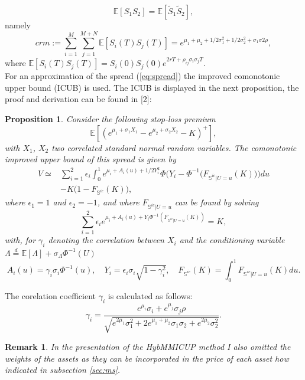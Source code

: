 \documentclass[a4paper]{article}
\newtheorem{prop}{Proposition}
\newtheorem*{remark}{Remark}
\begin{document}
$$\mathbb{E}[S_1S_2] = \mathbb{E}[\tilde{S}_1\tilde{S}_2],$$
namely
\begin{equation}
crm:=\sum_{i=1}^{M}\sum_{j=1}^{M+N}\mathbb{E}[S_i(T)S_j(T)]=e^{\mu_1+\mu_2+1/2\sigma_1^2+1/2\sigma_2^2+\sigma_1\sigma2\rho},
\end{equation}
where $\mathbb{E}[S_i(T)S_j(T)] = S_i(0) S_j(0) e^{2rT+\rho_{ij}\sigma_i\sigma_jT}.$\\
For an approximation of the spread (\ref{eq:spread}) the improved comonotonic upper bound (ICUB) is used. The ICUB is displayed in the next proposition, the proof and derivation can be found in [2]:
\begin{prop}
Consider the following stop-loss premium
$$\mathbb{E}[(e^{\mu_1+\sigma_1X_1}-e^{\mu_2+\sigma_2X_2}-K)^+],$$
with $X_1$, $X_2$ two correlated standard normal random variables. The comonotonic improved upper bound of this spread is given by
\begin{equation}
\label{eq:ints}
\begin{split}
V \simeq &\sum_{i=1}^2\epsilon_i\int_0^1e^{\mu_i+A_i(u)+1/2Y_i^2}\Phi\big(Y_i-\Phi^{-1}\big(F_{\mathbb{S}^{ic}|U=u}(K)\big)\big)du\\
	&-K\big(1-F_{\mathbb{S}^{ic}}(K)\big),
\end{split}
\end{equation}
where $\epsilon_1=1$ and $\epsilon_2=-1$, and where $F_{\mathbb{S}^{ic}|U=u}$ can be found by solving
\begin{equation}
\label{eq:fzero}
\sum_{i=1}^2\epsilon_ie^{\mu_i+A_i(u)+Y_i\Phi^{-1}(F_{\mathbb{S}^{ic}|U=u}(K))}=K,
\end{equation}
with, for $\gamma_i$ denoting the correlation between $X_i$ and the conditioning variable $\Lambda \stackrel{d}{=} \mathbb{E}[\Lambda]+\sigma_{\Lambda}\Phi^{-1}(U)$
\begin{equation*}
A_i(u)=\gamma_i\sigma_i\Phi^{-1}(u),\quad Y_i=\epsilon_i\sigma_i\sqrt{1-\gamma_i^2}, \quad F_{\mathbb{S}^{ic}}(K) = \int_0^1F_{\mathbb{S}^{ic}|U=u}(K)du.
\end{equation*}
\end{prop}
The corelation coefficient $\gamma_i$ is calculated as follows:
$$\gamma_i = \frac{e^{\mu_i}\sigma_i+e^{\mu_j}\sigma_j\rho}{\sqrt{e^{2\mu_1}\sigma_1^2+2e^{\mu_1+\mu_2}\sigma_1\sigma_2+e^{2\mu_2}\sigma_2^2}}.$$
\begin{remark}
In the presentation of the HybMMICUP method I also omitted the weights of the assets as they can be incorporated in the price of each asset how indicated in subsection \ref{sec:ms}.
\end{remark}
\end{document}
